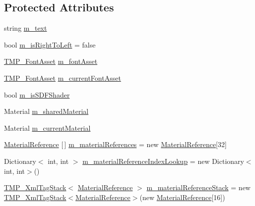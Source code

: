 \subsection*{Protected Attributes}
\begin{DoxyCompactItemize}
\item 
string \mbox{\hyperlink{class_t_m_pro_1_1_t_m_p___text_a50d158bc4c454d92597b6236f86b2110}{m\+\_\+text}}
\item 
bool \mbox{\hyperlink{class_t_m_pro_1_1_t_m_p___text_ab4b29627c52399906bc63bdfbdff9e72}{m\+\_\+is\+Right\+To\+Left}} = false
\item 
\mbox{\hyperlink{class_t_m_pro_1_1_t_m_p___font_asset}{T\+M\+P\+\_\+\+Font\+Asset}} \mbox{\hyperlink{class_t_m_pro_1_1_t_m_p___text_a187214e7552f9f330a3bef0cf4b0dc90}{m\+\_\+font\+Asset}}
\item 
\mbox{\hyperlink{class_t_m_pro_1_1_t_m_p___font_asset}{T\+M\+P\+\_\+\+Font\+Asset}} \mbox{\hyperlink{class_t_m_pro_1_1_t_m_p___text_a2e891ade8c2a04f612ebda734d8e29fc}{m\+\_\+current\+Font\+Asset}}
\item 
bool \mbox{\hyperlink{class_t_m_pro_1_1_t_m_p___text_a157bf0783bc537979bacdcb31931c166}{m\+\_\+is\+S\+D\+F\+Shader}}
\item 
Material \mbox{\hyperlink{class_t_m_pro_1_1_t_m_p___text_ad2365ba31daa210643db257aa6ce3279}{m\+\_\+shared\+Material}}
\item 
Material \mbox{\hyperlink{class_t_m_pro_1_1_t_m_p___text_a76524d575dd950f560c3a7b62c00a2b6}{m\+\_\+current\+Material}}
\item 
\mbox{\hyperlink{struct_t_m_pro_1_1_material_reference}{Material\+Reference}} \mbox{[}$\,$\mbox{]} \mbox{\hyperlink{class_t_m_pro_1_1_t_m_p___text_a940c7e3cd3ee953b9aecd62f9664bbfa}{m\+\_\+material\+References}} = new \mbox{\hyperlink{struct_t_m_pro_1_1_material_reference}{Material\+Reference}}\mbox{[}32\mbox{]}
\item 
Dictionary$<$ int, int $>$ \mbox{\hyperlink{class_t_m_pro_1_1_t_m_p___text_a0036c899ba05c07783237fc03616e53d}{m\+\_\+material\+Reference\+Index\+Lookup}} = new Dictionary$<$int, int$>$()
\item 
\mbox{\hyperlink{struct_t_m_pro_1_1_t_m_p___xml_tag_stack}{T\+M\+P\+\_\+\+Xml\+Tag\+Stack}}$<$ \mbox{\hyperlink{struct_t_m_pro_1_1_material_reference}{Material\+Reference}} $>$ \mbox{\hyperlink{class_t_m_pro_1_1_t_m_p___text_a2c7717e0df2a91a3ad89aec69672a6bf}{m\+\_\+material\+Reference\+Stack}} = new \mbox{\hyperlink{struct_t_m_pro_1_1_t_m_p___xml_tag_stack}{T\+M\+P\+\_\+\+Xml\+Tag\+Stack}}$<$\mbox{\hyperlink{struct_t_m_pro_1_1_material_reference}{Material\+Reference}}$>$(new \mbox{\hyperlink{struct_t_m_pro_1_1_material_reference}{Material\+Reference}}\mbox{[}16\mbox{]})

\end{DoxyCompactItemize}
